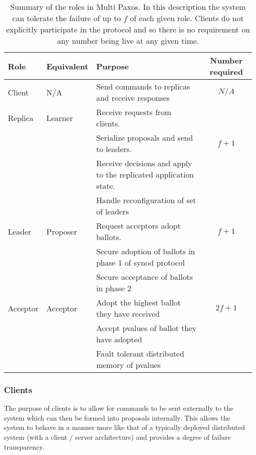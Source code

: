 \begin{table}
\centering
\begin{tabular}{ | l  | l | p{6cm} | c | } \hline
   \textbf{Role} & \textbf{Equivalent} & \textbf{Purpose} & \textbf{Number required} \\ \hline
   Client & N/A & Send commands to replicas and receive responses & $ N/A $ \\ \hline
  
   Replica & Learner & Receive requests from clients. &  \\
                 & & Serialize proposals and send to leaders. & $f + 1$ \\
                 & & Receive decisions and apply to the replicated application state. & \\
                 & & Handle reconfiguration of set of leaders & \\ \hline
  
  Leader & Proposer & Request acceptors adopt ballots. & $f + 1$ \\
               & & Secure adoption of ballots in phase 1 of synod protocol & \\
               & & Secure acceptance of ballots in phase 2 &  \\ \hline
               
  Acceptor & Acceptor & Adopt the highest ballot they have received & $2f + 1$ \\
                   & & Accept pvalues of ballot they have adopted & \\
                   & & Fault tolerant distributed memory of pvalues &  \\ \hline
\end{tabular}
\caption{Summary of the roles in Multi Paxos. In this description the system can tolerate the failure of up to $f$ of each given role. Clients do not explicitly participate in the protocol and so there is no requirement on any number being live at any given time.}
\label{table:multi-role-summary}
\end{table}

\subsubsection{Clients}

The purpose of clients is to allow for commands to be sent externally to the system which can then be formed into proposals internally. This allows the system to behave in a manner more like that of a typically deployed distributed system (with a client / server architecture) and provides a degree of failure transparency. \\


